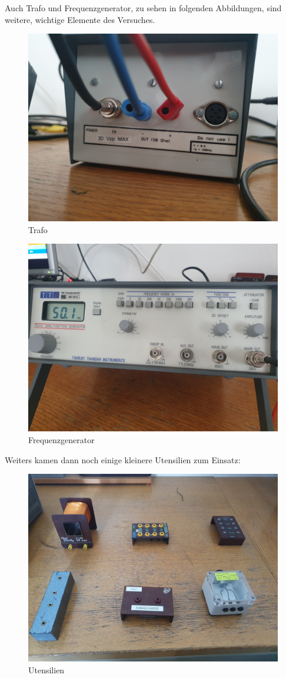 \documentclass[12pt,a4paper,twoside]{article}
\begin{document}
\noindent
Auch Trafo und Frequenzgenerator, zu sehen in folgenden Abbildungen, sind weitere, wichtige Elemente des Versuches. 

\begin{figure}[H]
    \centering
    \includegraphics[width=0.6\linewidth, angle=0]{nudes/Trafo.jpg}
    \caption{Trafo}
    \label{fig:Trafo}
\end{figure}

\begin{figure}[H]
    \centering
    \includegraphics[width=0.6\linewidth, angle=0]{nudes/Frequenzgenerator.jpg}
    \caption{Frequenzgenerator}
    \label{fig:Frequenzgenerator}
\end{figure}

\noindent
Weiters kamen dann noch einige kleinere Utensilien zum Einsatz:

\begin{figure}[H]
    \centering
    \includegraphics[width=0.6\linewidth, angle=0]{nudes/Utensilien.jpg}
    \caption{Utensilien}
    \label{fig:Utensilien}
\end{figure} 
\end{document}
